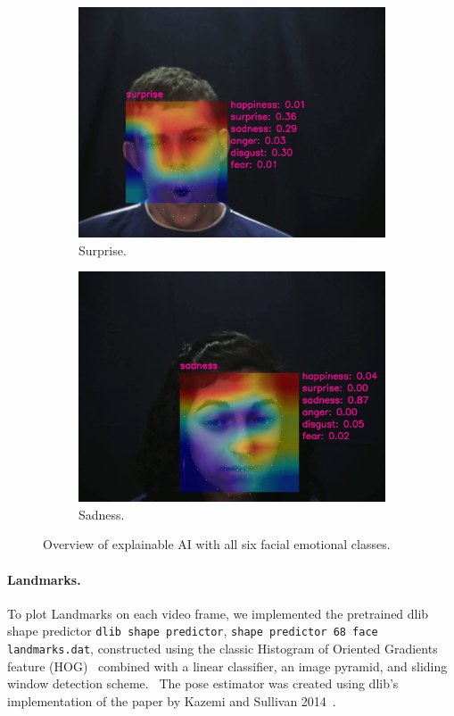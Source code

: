 \begin{figure}[ht]
\begin{subfigure}{0.24\linewidth}
    \includegraphics[width=\linewidth]{GiMeFive03.png}
    \caption{Surprise.}
    \label{fig:v3}
  \end{subfigure}
  \hfill
  \begin{subfigure}{0.24\linewidth}
    \includegraphics[width=\linewidth]{GiMeFive04.png}
    \caption{Sadness.}
    \label{fig:v4}
  \end{subfigure}
  \caption{Overview of explainable AI with all six facial emotional classes.}
  \label{fig:video}
\end{figure}

\paragraph{Landmarks.}
To plot Landmarks on each video frame, we implemented the pretrained dlib shape predictor 
\texttt{dlib shape predictor}, %
\texttt{shape predictor 68 face landmarks.dat}, 
constructed using the classic Histogram of Oriented Gradients feature (HOG)~\cite{1467360} combined with a linear classifier, 
an image pyramid, and sliding window detection scheme.~\cite{dlib_site}
The pose estimator was created using dlib's implementation of the paper by Kazemi and Sullivan 2014~\cite{6909637}.

